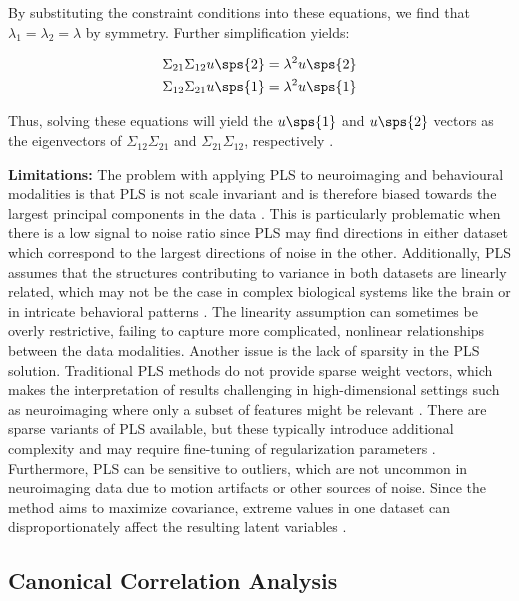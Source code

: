 By substituting the constraint conditions into these equations, we find that \( \lambda_1 = \lambda_2 = \lambda \) by symmetry. Further simplification yields:

\begin{align}
    \Sigma_{21} \Sigma_{12} u\sps{2} &= \lambda^2 u\sps{2} \\
    \Sigma_{12} \Sigma_{21} u\sps{1} &= \lambda^2 u\sps{1}
\end{align}

Thus, solving these equations will yield the \( u\sps{1} \) and \( u\sps{2} \) vectors as the eigenvectors of \( \Sigma_{12} \Sigma_{21} \) and \( \Sigma_{21} \Sigma_{12} \), respectively \citep{hoskuldsson1988pls}.

\textbf{Limitations: } The problem with applying PLS to neuroimaging and behavioural modalities is that PLS is not scale invariant and
is therefore biased towards the largest principal components in the data \citep{helmer2020stability}.
This is particularly problematic when there is a low signal to noise ratio since PLS may find directions in either dataset which correspond to the largest directions of noise in the other.
Additionally, PLS assumes that the structures contributing to variance in both datasets are linearly related, which
may not be the case in complex biological systems like the brain or in intricate behavioral patterns \citep{rosipal2005overview}.
The linearity assumption can sometimes be overly restrictive, failing to capture more complicated, nonlinear relationships between the data modalities.
Another issue is the lack of sparsity in the PLS solution.
Traditional PLS methods do not provide sparse weight vectors, which makes the interpretation of results challenging in high-dimensional settings such as neuroimaging where only a subset of features might be relevant \citep{leurgans1993canonical}.
There are sparse variants of PLS available, but these typically introduce additional complexity and may require fine-tuning of regularization parameters \citep{chun2010sparse}.
Furthermore, PLS can be sensitive to outliers, which are not uncommon in neuroimaging data due to motion artifacts or other sources of noise.
Since the method aims to maximize covariance, extreme values in one dataset can disproportionately affect the resulting latent variables \citep{wold1975path}.

\subsection{Canonical Correlation Analysis}\label{sec:cca}


